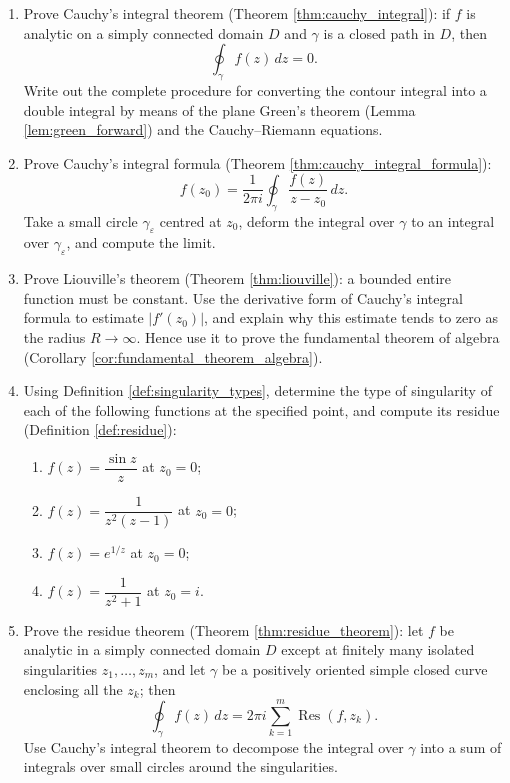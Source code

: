 \begin{enumerate}[leftmargin=3em, label=\textbf{Exercise \arabic*}]
    \item Prove Cauchy's integral theorem (Theorem \ref{thm:cauchy_integral}):
    if $f$ is analytic on a simply connected domain $D$ and $\gamma$ is a closed path in $D$, then
    \[
    \oint_\gamma f(z)\,dz=0.
    \]
    Write out the complete procedure for converting the contour integral into a double integral
    by means of the plane Green's theorem (Lemma \ref{lem:green_forward}) and the Cauchy--Riemann equations.

    \item Prove Cauchy's integral formula (Theorem \ref{thm:cauchy_integral_formula}):
    \[
    f(z_0)=\frac{1}{2\pi i}\oint_\gamma\frac{f(z)}{z-z_0}\,dz.
    \]
    Take a small circle $\gamma_\varepsilon$ centred at $z_0$,
    deform the integral over $\gamma$ to an integral over $\gamma_\varepsilon$, and compute the limit.

    \item Prove Liouville's theorem (Theorem \ref{thm:liouville}):
    a bounded entire function must be constant.
    Use the derivative form of Cauchy's integral formula to estimate $|f'(z_0)|$,
    and explain why this estimate tends to zero as the radius $R\to\infty$.
    Hence use it to prove the fundamental theorem of algebra (Corollary \ref{cor:fundamental_theorem_algebra}).

    \item Using Definition \ref{def:singularity_types}, determine the type of singularity of each of the following functions at the specified point,
    and compute its residue (Definition \ref{def:residue}):
    \begin{enumerate}[label=(\roman*)]
        \item $f(z)=\dfrac{\sin z}{z}$ at $z_0=0$;
        \item $f(z)=\dfrac{1}{z^2(z-1)}$ at $z_0=0$;
        \item $f(z)=e^{1/z}$ at $z_0=0$;
        \item $f(z)=\dfrac{1}{z^2+1}$ at $z_0=i$.
    \end{enumerate}

    \item Prove the residue theorem (Theorem \ref{thm:residue_theorem}):
    let $f$ be analytic in a simply connected domain $D$ except at finitely many isolated singularities $z_1,\dots,z_m$,
    and let $\gamma$ be a positively oriented simple closed curve enclosing all the $z_k$; then
    \[
    \oint_\gamma f(z)\,dz=2\pi i\sum_{k=1}^{m}\operatorname{Res}(f,z_k).
    \]
    Use Cauchy's integral theorem to decompose the integral over $\gamma$ into a sum of integrals over small circles around the singularities.


\end{enumerate}
